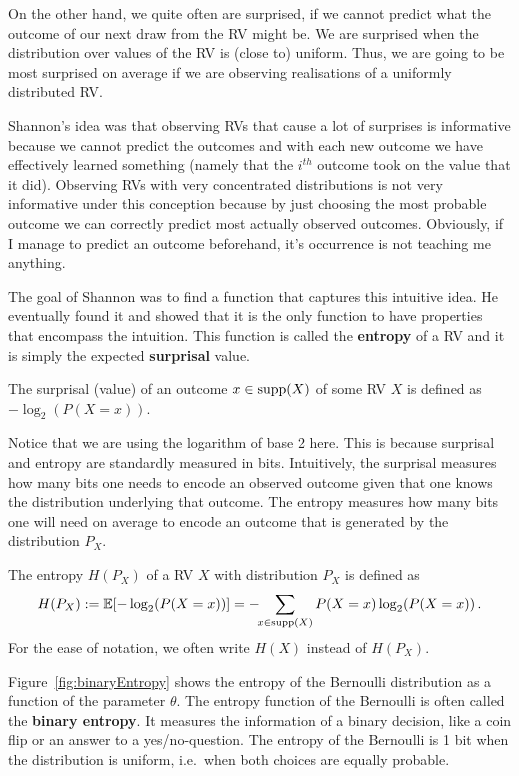On the other hand, we quite often are surprised,
if we cannot predict what the outcome of our next draw from the RV might be. We are surprised when the distribution over values of the RV is (close to) uniform. Thus,
we are going to be most surprised on average if we are observing realisations of a uniformly distributed RV.

Shannon's idea was that observing RVs that cause a lot of surprises is informative because we cannot predict the outcomes and with each new outcome we have effectively
learned something  (namely that the $ i^{th} $ outcome took on the value that it did). Observing RVs with very concentrated distributions is not very informative
under this conception because by just choosing the most probable outcome we can correctly predict most actually observed outcomes. Obviously, if I manage to predict
an outcome beforehand, it's occurrence is not teaching me anything.

The goal of Shannon was to find a function that captures this intuitive idea. He eventually found it and showed that it is the only function to have properties
that encompass the intuition. This function is called the \textbf{entropy} of a RV and it is simply the expected \textbf{surprisal} value.

\begin{Definition}[Surprisal]
The surprisal (value) of an outcome $ x \in \operatorname{supp}(X) $ of some RV $ X $ is defined as $ -\log_{2}(P(X=x))$.
\end{Definition} 

Notice that we are using the logarithm of base 2 here. This is because surprisal and entropy are standardly measured in bits. Intuitively, the surprisal measures
how many bits one needs to encode an observed outcome given that one knows the distribution underlying that outcome. The entropy measures how many bits one
will need on average to encode an outcome that is generated by the distribution $ P_{X} $.

\begin{Definition}[Entropy]
The entropy $H(P_X)$ of a RV $ X $ with distribution $P_X$ is defined as 
$$H(P_X) := \mathbb{E}[-\log_{2}(P(X=x))] = - \!\! \sum_{x \in \operatorname{supp}(X)} P(X=x) \log_2(P(X=x)) \, .$$ 
For the ease of notation, we often write $H(X)$ instead of $H(P_X)$.
\end{Definition}

Figure~\ref{fig:binaryEntropy} shows the entropy of the Bernoulli distribution as a function of the
parameter $ \theta $. The entropy function of the Bernoulli is often called the \textbf{binary entropy}.
It measures the information of a binary decision, like a coin flip or an answer to a yes/no-question.
The entropy of the Bernoulli is 1 bit when the distribution is uniform, i.e.\ when both choices are equally 
probable. 

